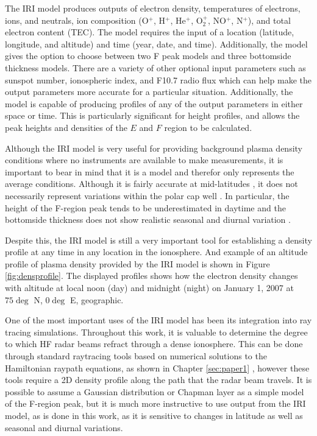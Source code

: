 The IRI model produces outputs of electron density, temperatures of electrons, ions, and neutrals, ion composition (O\(^+\), H\(^+\), He\(^+\), O\(_2^+\), NO\(^+\), N\(^+\)), and total electron content (TEC).  The model requires the input of a location (latitude, longitude, and altitude) and time (year, date, and time).  Additionally, the model gives the option to choose between two F peak models and three bottomside thickness models.  There are a variety of other optional input parameters such as sunspot number, ionospheric index, and F10.7 radio flux which can help make the output parameters more accurate for a particular situation.  Additionally, the model is capable of producing profiles of any of the output parameters in either space or time.  This is particularly significant for height profiles, and allows the peak heights and densities of the \(E\) and \(F\) region to be calculated.

Although the IRI model is very useful for providing background plasma density conditions where no instruments are available to make measurements, it is important to bear in mind that it is a model and therefor only represents the average conditions.  Although it is fairly accurate at mid-latitudes \citep{Coisson2006,Bilitza2012}, it does not necessarily represent variations within the polar cap well \citep{Themens2014,Makarevich2015}.  In particular, the height of the F-region peak tends to be underestimated in daytime and the bottomside thickness does not show realistic seasonal and diurnal variation \citep{Themens2014}.  

Despite this, the IRI model is still a very important tool for establishing a density profile at any time in any location in the ionosphere.  And example of an altitude profile of plasma density provided by the IRI model is shown in Figure \ref{fig:densprofile}.  The displayed profiles shows how the electron density changes with altitude at local noon (day) and midnight (night) on January 1, 2007 at \(75\deg\) N, \(0\deg\) E, geographic.

One of the most important uses of the IRI model has been its integration into ray tracing simulations.  Throughout this work, it is valuable to determine the degree to which HF radar beams refract through a dense ionosphere.  This can be done through standard raytracing tools based on numerical solutions to the Hamiltonian raypath equations, as shown in Chapter \ref{sec:paper1} \citep{Haselgrove1963,Jones1975}, however these tools require a 2D density profile along the path that the radar beam travels.  It is possible to assume a Gaussian distribution or Chapman layer as a simple model of the F-region peak, but it is much more instructive to use output from the IRI model, as is done in this work, as it is sensitive to changes in latitude as well as seasonal and diurnal variations.

